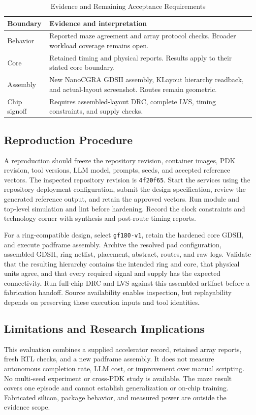﻿\documentclass[conference,letterpaper]{IEEEtran}
\begin{document}
\begin{table}[t]
\caption{Evidence and Remaining Acceptance Requirements}
\label{tab:scope}\centering\small
\begin{tabular}{p{}p{}}\toprule
Boundary & Evidence and interpretation\\\midrule
Behavior & Reported maze agreement and array protocol checks. Broader workload coverage remains open.\\
Core & Retained timing and physical reports. Results apply to their stated core boundary.\\
Assembly & New NanoCGRA GDSII assembly, KLayout hierarchy readback, and actual-layout screenshot. Routes remain geometric.\\
Chip signoff & Requires assembled-layout DRC, complete LVS, timing constraints, and supply checks.\\\bottomrule
\end{tabular}
\end{table}

\subsection{Reproduction Procedure}
A reproduction should freeze the repository revision, container images, PDK revision, tool versions, LLM model, prompts, seeds, and accepted reference vectors. The inspected repository revision is \texttt{4f20f65}. Start the services using the repository deployment configuration, submit the design specification, review the generated reference output, and retain the approved vectors. Run module and top-level simulation and lint before hardening. Record the clock constraints and technology corner with synthesis and post-route timing reports.

For a ring-compatible design, select \texttt{gf180-v1}, retain the hardened core GDSII, and execute padframe assembly. Archive the resolved pad configuration, assembled GDSII, ring netlist, placement, abstract, routes, and raw logs. Validate that the resulting hierarchy contains the intended ring and core, that physical units agree, and that every required signal and supply has the expected connectivity. Run full-chip DRC and LVS against this assembled artifact before a fabrication handoff. Source availability enables inspection, but replayability depends on preserving these execution inputs and tool identities.

\subsection{Limitations and Research Implications}
This evaluation combines a supplied accelerator record, retained array reports, fresh RTL checks, and a new padframe assembly. It does not measure autonomous completion rate, LLM cost, or improvement over manual scripting. No multi-seed experiment or cross-PDK study is available. The maze result covers one episode and cannot establish generalization or on-chip training. Fabricated silicon, package behavior, and measured power are outside the evidence scope.
\end{document}

